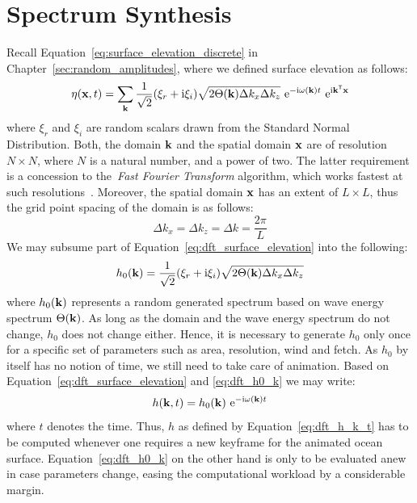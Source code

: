 \section{Spectrum Synthesis}
\label{sec:spectrum_synthesis}
Recall Equation~\ref{eq:surface_elevation_discrete} in Chapter~\ref{sec:random_amplitudes},
where we defined surface elevation as follows:
\begin{equation}
\label{eq:dft_surface_elevation}
\eta(\mathbf{x}, t) = 
\sum_{\mathbf{k}}\frac{1}{\sqrt{2}}(\xi_r+\mathrm{i}\xi_i)
\sqrt{2\Theta(\mathbf{k})\Delta k_x \Delta k_z} 
~\mathrm{e}^{-\mathrm{i}\omega(\mathbf{k})t}
~\mathrm{e}^{\mathrm{i}\mathbf{k}^{\mathsf{T}}\mathbf{x}}
\end{equation}
where $\xi_r$ and $\xi_i$ are random scalars drawn from the Standard Normal
Distribution. Both, the \wavevector domain $\mathbf{k}$ and the
spatial domain $\mathbf{x}$ are of resolution $N \times N$, where $N$ is a natural
number, and a power of two. The latter requirement is a concession to
the~\emph{Fast Fourier Transform} algorithm, which works fastest at such
resolutions~\citep{Cooley:1965}.
Moreover, the spatial domain $\mathbf{x}$ has an extent of $L \times L$, thus the
grid point spacing of the \wavevector domain is as follows:
\begin{equation*}
	\Delta k_x = \Delta k_z = \Delta k = \frac{2\pi}{L}
\end{equation*}
We may subsume part of Equation~\ref{eq:dft_surface_elevation} into the
following:
\begin{equation}
\label{eq:dft_h0_k}
h_0(\mathbf{k}) = \frac{1}{\sqrt{2}}(\xi_r+\mathrm{i}\xi_i)\sqrt{2\Theta(\mathbf{k})\Delta k_x \Delta k_z}
\end{equation}
where $h_0(\mathbf{k})$ represents a random generated spectrum based on wave
energy spectrum $\Theta(\mathbf{k})$. As long as the \wavevector domain and the
wave energy spectrum do not change, $h_0$ does not change either. Hence, it is
necessary to generate $h_0$ only once for a specific set of parameters such as
area, resolution, wind and fetch. As $h_0$ by itself has no notion of time,
we still need to take care of animation. Based on Equation~\ref{eq:dft_surface_elevation}
and \ref{eq:dft_h0_k} we may write:
\begin{equation}
\label{eq:dft_h_k_t}
h(\mathbf{k},t) = h_0(\mathbf{k})~\mathrm{e}^{-\mathrm{i}\omega(\mathbf{k})t}
\end{equation}
where $t$ denotes the time.
Thus, $h$ as defined by Equation~\ref{eq:dft_h_k_t} has to be computed whenever
one requires a new keyframe for the animated ocean surface.
Equation~\ref{eq:dft_h0_k} on the other hand is only to be evaluated anew in
case parameters change, easing the computational workload by a
considerable margin.


